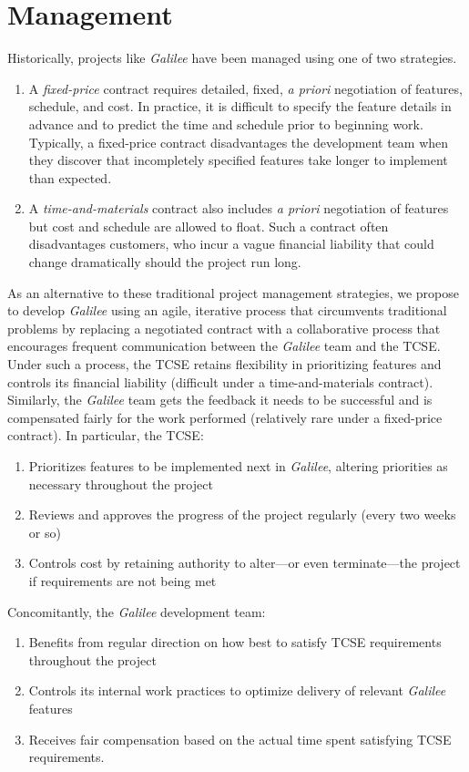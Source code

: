 \documentclass{article}
\newcommand{\gal}{\emph{Galilee}}
\newcommand{\tcse}{TCSE}
\begin{document}
\section{Management}
\label{sec:management}

Historically,
projects like \gal{} have been managed using one of two strategies.
\begin{enumerate}
\item A \emph{fixed-price} contract
  requires detailed, fixed, \emph{a priori} negotiation of
  features, schedule, and cost.
  In practice, it is difficult to specify the feature details in advance
  and to predict the time and schedule prior to beginning work.
  Typically, a fixed-price contract disadvantages the development team
  when they discover that incompletely specified features
  take longer to implement than expected.
\item A \emph{time-and-materials} contract
  also includes \emph{a priori} negotiation of features
  but cost and schedule are allowed to float.
  Such a contract often disadvantages customers,
  who incur a vague financial liability
  that could change dramatically should the project run long.
\end{enumerate}
As an alternative to these traditional project management strategies,
we propose to develop \gal{}
using an agile, iterative process
that circumvents traditional problems
by replacing a negotiated contract
with a collaborative process that
encourages frequent communication between the \gal{} team and the \tcse.
Under such a process,
the \tcse{} retains flexibility in prioritizing features
and controls its financial liability
(difficult under a time-and-materials contract).
Similarly, the \gal{} team gets the feedback it needs to be successful
and is compensated fairly for the work performed
(relatively rare under a fixed-price contract).
In particular, the \tcse{}:
\begin{enumerate}
\item Prioritizes features to be implemented next in \gal,
  altering priorities as necessary throughout the project
\item Reviews and approves the progress of the project
  regularly (every two weeks or so)
\item Controls cost by retaining authority to alter---or even terminate---the project 
if requirements are not being met
\end{enumerate}
Concomitantly, the \gal{} development team:
\begin{enumerate}
\item Benefits from regular direction on how best
  to satisfy \tcse{} requirements throughout the project
\item Controls its internal work practices to optimize
  delivery of relevant \gal{} features
\item Receives fair compensation
  based on the actual time spent satisfying \tcse{} requirements.
\end{enumerate}
\end{document}
